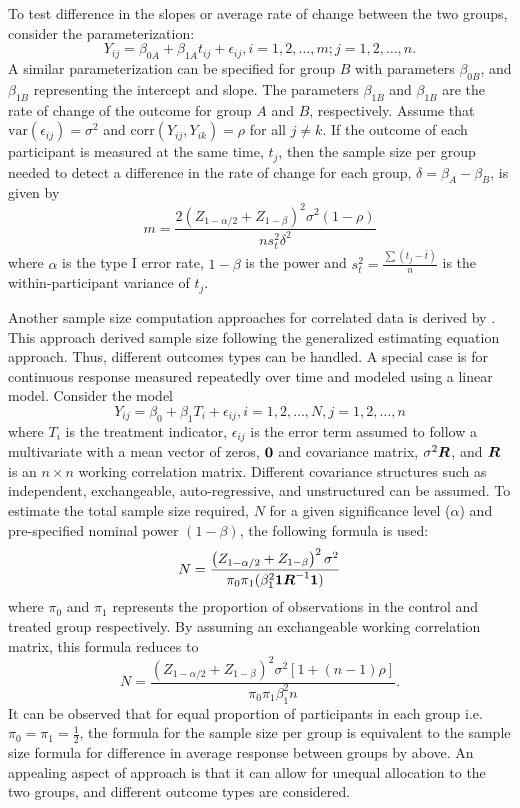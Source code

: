 To test difference in the slopes or average rate of change between the two groups, consider the parameterization:
$$Y_{ij}=\beta_{0A}+\beta_{1A}t_{ij}+\epsilon_{ij}, i=1,2,\dots,m; j=1,2,\dots,n.$$
A similar parameterization can be specified for group $B$ with parameters $\beta_{0B}$, and $\beta_{1B}$ representing the intercept and slope. The parameters $\beta_{1B}$ and $\beta_{1B}$ are the rate of change of the outcome for group $A$ and $B$, respectively. Assume that $\mbox{var}(\epsilon_{ij})=\sigma^2$ and $\mbox{corr}(Y_{ij},Y_{ik})=\rho$ for all $j\neq k$. If the outcome of each participant is measured at the same time, $t_j$, then the sample size per group needed to detect a difference in the rate of change for each group, $\delta=\beta_A-\beta_B$, is given by
$$m=\frac{2(Z_{1-\alpha/2}+Z_{1-\beta})^2\sigma^2(1-\rho)}{ns^2_t\delta^2}$$
where $\alpha$ is the type I error rate, $1-\beta$ is the power and $s^2_t=\frac{\sum (t_j-\bar{t})}{n}$ is the within-participant variance of $t_j$. 

Another sample size computation approaches for correlated data is derived by \cite{Liu_Liang(1997)}. This approach derived sample size following the generalized estimating equation \citep{Liang_Zeger(1986)} approach. Thus, different outcomes types can be handled. A special case is for continuous response measured repeatedly over time and modeled using a linear model. Consider the model $$Y_{ij}=\beta_0+\beta_1T_i+\epsilon_{ij}, i=1,2,\dots, N,j=1,2,\dots,n$$
where $T_i$ is the treatment indicator, $\epsilon_{ij}$ is the error term assumed to follow a multivariate with a mean vector of zeros, $\mbox{\boldmath $0$}$ and covariance matrix, $\sigma^2\mbox{\boldmath $R$}$, and $\mbox{\boldmath $R$}$ is an $n\times n$ working correlation matrix. Different covariance structures such as independent, exchangeable, auto-regressive, and unstructured can be assumed. To estimate the total sample size required, $N$ for a given significance level ($\alpha$) and pre-specified nominal power $(1-\beta)$, the following formula is used:
$$N=\frac{\left(Z_{1-\alpha/2}+Z_{1-\beta}\right)^2\sigma^2}{\pi_0\pi_1(\beta_1^2\mbox{\boldmath $1$}\mbox{\boldmath $R$}^{-1}\mbox{\boldmath $1$})}$$
where $\pi_0$ and $\pi_1$ represents the proportion of observations in the control and treated group respectively. By assuming an exchangeable working correlation matrix, this formula reduces to
$$N=\frac{\left(Z_{1-\alpha/2}+Z_{1-\beta}\right)^2\sigma^2[1+(n-1)\rho]}{\pi_0\pi_1\beta_1^2n}.$$  
It can be observed that for equal proportion of participants in each group i.e. $\pi_0=\pi_1=\frac{1}{2}$,  the formula for the sample size per group is equivalent to the sample size formula for difference in average response between groups by \cite{Diggle_etal(2002)} above. An appealing aspect of \cite{Liu_Liang(1997)} approach is that it can allow for unequal allocation to the two groups, and different outcome types are considered. 

